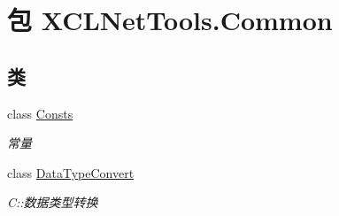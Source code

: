 \hypertarget{namespace_x_c_l_net_tools_1_1_common}{\section{包 X\-C\-L\-Net\-Tools.\-Common}
\label{namespace_x_c_l_net_tools_1_1_common}
}
\subsection*{类}
\begin{DoxyCompactItemize}
\item 
class \hyperlink{class_x_c_l_net_tools_1_1_common_1_1_consts}{Consts}
\begin{DoxyCompactList}\small\item\em 常量 \end{DoxyCompactList}\item 
class \hyperlink{class_x_c_l_net_tools_1_1_common_1_1_data_type_convert}{Data\-Type\-Convert}
\begin{DoxyCompactList}\small\item\em C\-::数据类型转换 \end{DoxyCompactList}\end{DoxyCompactItemize}
